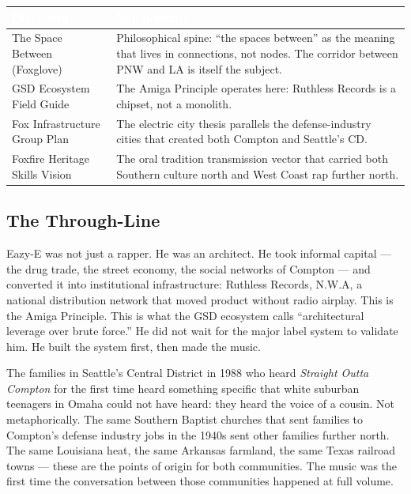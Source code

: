 \documentclass[11pt,letterpaper]{article}
\newcommand{\tableheader}[1]{\textbf{\sffamily\textcolor{white}{#1}}}
\begin{document}
\begin{center}
\begin{tabularx}{\textwidth}{L{4cm}X}
\toprule
{}
\tableheader{Document} & \tableheader{Relationship} \\
\midrule
The Space Between (Foxglove) & Philosophical spine: ``the spaces between'' as the meaning that lives in connections, not nodes. The corridor between PNW and LA is itself the subject. \\
GSD Ecosystem Field Guide & The Amiga Principle operates here: Ruthless Records is a chipset, not a monolith. \\
Fox Infrastructure Group Plan & The electric city thesis parallels the defense-industry cities that created both Compton and Seattle's CD. \\
Foxfire Heritage Skills Vision & The oral tradition transmission vector that carried both Southern culture north and West Coast rap further north. \\
\bottomrule
\end{tabularx}
\end{center}

\subsection{The Through-Line}

Eazy-E was not just a rapper. He was an architect. He took informal capital --- the drug trade, the street economy, the social networks of Compton --- and converted it into institutional infrastructure: Ruthless Records, N.W.A, a national distribution network that moved product without radio airplay. This is the Amiga Principle. This is what the GSD ecosystem calls ``architectural leverage over brute force.'' He did not wait for the major label system to validate him. He built the system first, then made the music.

The families in Seattle's Central District in 1988 who heard \textit{Straight Outta Compton} for the first time heard something specific that white suburban teenagers in Omaha could not have heard: they heard the voice of a cousin. Not metaphorically. The same Southern Baptist churches that sent families to Compton's defense industry jobs in the 1940s sent other families further north. The same Louisiana heat, the same Arkansas farmland, the same Texas railroad towns --- these are the points of origin for both communities. The music was the first time the conversation between those communities happened at full volume.
\end{document}
